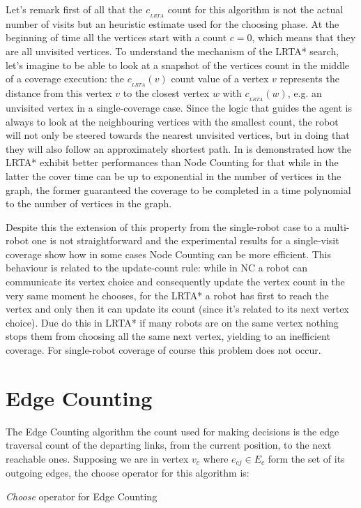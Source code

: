 Let's remark first of all that the $c_{_{LRTA}}$ count for this algorithm is not the actual number of visits but an heuristic estimate used for the choosing phase. At the beginning of time all the vertices start with a count $c=0$, which means that they are all unvisited vertices. To understand the mechanism of the LRTA* search, let's imagine to be able to look at a snapshot of the vertices count in the middle of a coverage execution: the $c_{_{LRTA}}(v)$ count value of a vertex $v$ represents the distance from this vertex $v$ to the closest vertex $w$ with $c_{_{LRTA}}(w)$, e.g. an unvisited vertex in a single-coverage case. Since the logic that guides the agent is always to look at the neighbouring vertices with the smallest count, the robot will not only be steered towards the nearest unvisited vertices, but in doing that they will also follow an approximately shortest path.
In \cite{koenig2001} is demonstrated how the LRTA* exhibit better performances than Node Counting for that while in the latter the cover time can be up to exponential in the number of vertices in the graph, the former guaranteed the coverage to be completed in a time polynomial to the number of vertices in the graph.

Despite this the extension of this property from the single-robot case to a multi-robot one is not straightforward and the experimental results for a single-visit coverage show how in some cases Node Counting can be more efficient. This behaviour is related to the update-count rule: while in NC a robot can communicate its vertex choice and consequently update the vertex count in the very same moment he chooses, for the LRTA* a robot has first to reach the vertex and only then it can update its count (since it's related to its next vertex choice). Due do this in LRTA* if many robots are on the same vertex nothing stops them from choosing all the same next vertex, yielding to an inefficient coverage. For single-robot coverage of course this problem does not occur. 


\section{Edge Counting}
The Edge Counting algorithm the count used for making decisions is the edge traversal count of the departing links, from the current position, to the next reachable ones. Supposing we are in vertex $v_c$ where $e_{cj} \in E_c$ form the set of its outgoing edges, the choose operator for this algorithm is:

\begin{algorithm}
\begin{algorithmic}[1]
 \label{a:find_next_ec}
\label{eq:ec_rule}
\end{algorithmic}
\caption{\emph{Choose} operator for Edge Counting}\label{alg:rt_ec}
\end{algorithm}

